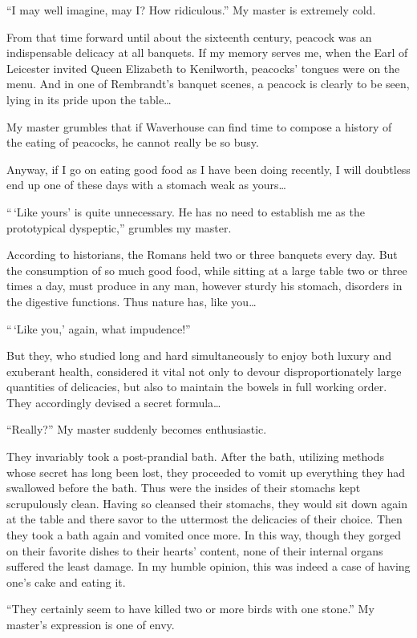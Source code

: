 \documentclass{book}
\begin{document}
``I may well imagine, may I? How ridiculous.'' My master is extremely
cold.

From that time forward until about the sixteenth century, peacock was an
indispensable delicacy at all banquets. If my memory serves me, when the
Earl of Leicester invited Queen Elizabeth to Kenilworth, peacocks'
tongues were on the menu. And in one of Rembrandt's banquet scenes, a
peacock is clearly to be seen, lying in its pride upon the table\ldots{}

My master grumbles that if Waverhouse can find time to compose a history
of the eating of peacocks, he cannot really be so busy.

Anyway, if I go on eating good food as I have been doing recently, I
will doubtless end up one of these days with a stomach weak as
yours\ldots{}

``\,`Like yours' is quite unnecessary. He has no need to establish me as
the prototypical dyspeptic,'' grumbles my master.

According to historians, the Romans held two or three banquets every
day. But the consumption of so much good food, while sitting at a large
table two or three times a day, must produce in any man, however sturdy
his stomach, disorders in the digestive functions. Thus nature has, like
you\ldots{}

``\,`Like you,' again, what impudence!''

But they, who studied long and hard simultaneously to enjoy both luxury
and exuberant health, considered it vital not only to devour
disproportionately large quantities of delicacies, but also to maintain
the bowels in full working order. They accordingly devised a secret
formula\ldots{}

``Really?'' My master suddenly becomes enthusiastic.

They invariably took a post-prandial bath. After the bath, utilizing
methods whose secret has long been lost, they proceeded to vomit up
everything they had swallowed before the bath. Thus were the insides of
their stomachs kept scrupulously clean. Having so cleansed their
stomachs, they would sit down again at the table and there savor to the
uttermost the delicacies of their choice. Then they took a bath again
and vomited once more. In this way, though they gorged on their favorite
dishes to their hearts' content, none of their internal organs suffered
the least damage. In my humble opinion, this was indeed a case of having
one's cake and eating it.

``They certainly seem to have killed two or more birds with one stone.''
My master's expression is one of envy.
\end{document}
